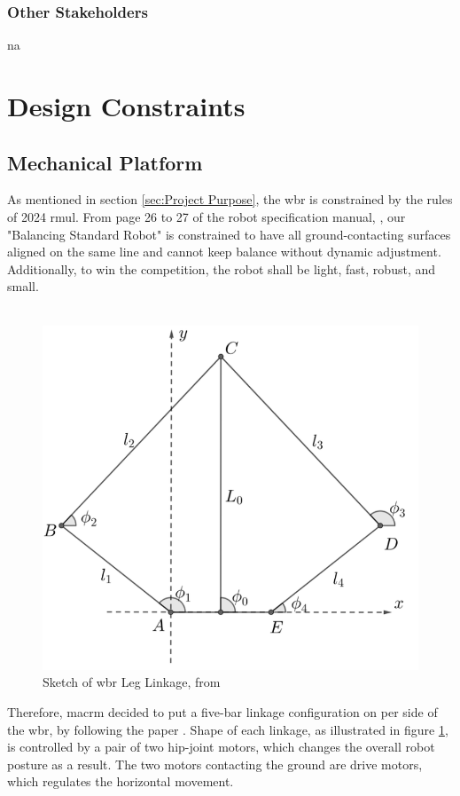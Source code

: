 \documentclass[12pt]{article}
\begin{document}
\subsubsection{Other Stakeholders}
\acrshort{na}


\section{Design Constraints} \label{sec:Design Constraints}
\subsection{Mechanical Platform}
As mentioned in section \ref{sec:Project Purpose}, the \acrshort{wbr} is constrained by the rules of 2024 \acrshort{rmul}. From page 26 to 27 of the robot specification manual, \citet{RmuBuildSpecs2024}, our "Balancing Standard Robot" is constrained to have all ground-contacting surfaces aligned on the same line and cannot keep balance without dynamic adjustment. Additionally, to win the competition, the robot shall be light, fast, robust, and small.\\\\
\begin{figure}[H]
    \centering
    \includegraphics[scale=0.5]{../Leg Linkage.png}
    \caption{Sketch of \acrshort{wbr} Leg Linkage, from \citet{HarbinEngCtrlDesign2022}}
    \label{fig:Leg Linkage}
\end{figure}
Therefore, \acrshort{macrm} decided to put a five-bar linkage configuration on per side of the \acrshort{wbr}, by following the paper \citet{WbrBalanceControl2021}. Shape of each linkage, as illustrated in figure \ref{fig:Leg Linkage}, is controlled by a pair of two hip-joint motors, which changes the overall robot posture as a result. The two motors contacting the ground are drive motors, which regulates the horizontal movement.
\end{document}
